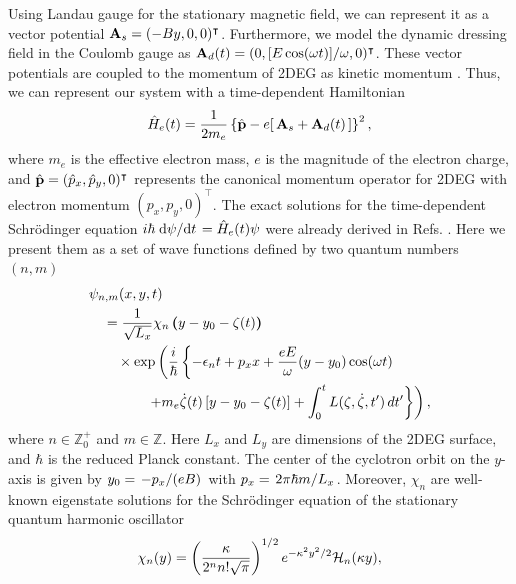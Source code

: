 \documentclass[
 reprint,
 amsmath,amssymb,
 aps,
 prb,
]{revtex4-2}
\begin{document}
Using Landau gauge for the stationary magnetic field, we can represent it as a vector potential $\vb{A}_{s} = (-By,0,0)^{\intercal}$. Furthermore, we model the dynamic dressing field in the Coulomb gauge as $\vb{A}_{d}(t) = (0,[E\cos(\omega t)]/\omega,0)^{\intercal}$. These vector potentials are coupled to the momentum of 2DEG as kinetic momentum \cite{mahan00,bruus04}. Thus, we can represent our system with a time-dependent Hamiltonian
\begin{equation} \label{eq:1}
  \hat{H}_e(t) =
  \frac{1}{2m_e}
  \left\{ \hat{\vb{p}} - e\right[ \vb{A}_{s}+\vb{A}_{d}(t) \left] \right\}^2,
\end{equation}
where $m_e$ is the effective electron mass, $e$ is the magnitude of the electron charge, and $\hat{\vb{p}} = (\hat{p}_x,\hat{p}_y,0)^{\intercal}$ represents the canonical momentum operator for 2DEG with electron momentum $(p_{x},p_{y},0)^{\intercal}$.
The exact solutions for the time-dependent Schrödinger equation $i\hbar \dv*{\psi}{t} = \hat{H}_e(t)\psi$ were already derived in Refs. \cite{husimi53,ditt98,dini16}. Here we present them as a set of wave functions defined by two quantum numbers $(n,m)$
\begin{equation} \label{eq:2}
  \begin{aligned}
    &\psi_{n,m}(x,y,t)  \\
      & \quad = \frac{1}{\sqrt{L_x}}
        \chi_n \bm{\left(} y - y_0 - \zeta(t) \bm{\right)}\\
      & \qquad \times
        \exp \bm{\left(}
        \frac{i}{\hbar}\left\{- \epsilon_n t
        + p_x x + \frac{eE}{\omega}(y - y_0)\cos(\omega t) \right.\right.\\
      & \left.\left. \qquad\qquad +
        m_e\dot{\zeta}(t)\left[y - y_0 -\zeta(t)\right] +
        \int_0^{t}L(\zeta,\dot{\zeta},t')\,dt' \right\}\bm{\right)},
  \end{aligned}
\end{equation}
where $n \in \mathbb{Z}^+_0$ and $m \in \mathbb{Z}$. Here $L_{x}$ and $L_{y}$ are dimensions of the 2DEG surface, and $\hbar$ is the reduced Planck constant. The center of the cyclotron orbit on the $y$-axis is given by $y_0 = \flatfrac{-p_x}{(eB)}$ with $p_x = \flatfrac{2\pi\hbar m}{L_x}$.
Moreover, $\chi_n$ are well-known eigenstate solutions for the Schrödinger equation of the stationary quantum harmonic oscillator
\begin{equation} \label{eq:3}
  \chi_n(y) =
  \left( \frac{\kappa}{2^{n}n! \sqrt{\pi}}\right)^{1/2}
  e^{-\kappa^2 y^2/2}
  \mathcal{H}_n \qty(\kappa y),
\end{equation}
\end{document}
